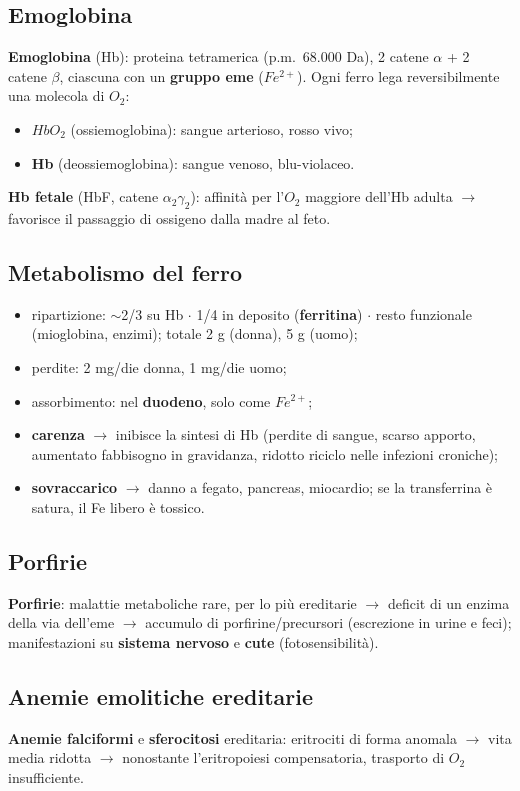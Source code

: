 \subsection{Emoglobina}
\textbf{Emoglobina} (Hb): proteina tetramerica (p.m.\ 68.000 Da), 2 catene $\alpha$ + 2 catene
$\beta$, ciascuna con un \textbf{gruppo eme} ($Fe^{2+}$). Ogni ferro lega reversibilmente una
molecola di $O_2$:
\begin{itemize}
  \item \textbf{$HbO_2$} (ossiemoglobina): sangue arterioso, rosso vivo;
  \item \textbf{Hb} (deossiemoglobina): sangue venoso, blu-violaceo.
\end{itemize}
\textbf{Hb fetale} (HbF, catene $\alpha_2\gamma_2$): affinità per l'$O_2$ maggiore dell'Hb adulta
$\rightarrow$ favorisce il passaggio di ossigeno dalla madre al feto.

\subsection{Metabolismo del ferro}
\begin{itemize}
  \item ripartizione: $\sim$2/3 su Hb $\cdot$ 1/4 in deposito (\textbf{ferritina}) $\cdot$ resto
    funzionale (mioglobina, enzimi); totale 2 g (donna), 5 g (uomo);
  \item perdite: 2 mg/die donna, 1 mg/die uomo;
  \item assorbimento: nel \textbf{duodeno}, solo come $Fe^{2+}$;
  \item \textbf{carenza} $\rightarrow$ inibisce la sintesi di Hb (perdite di sangue, scarso apporto,
    aumentato fabbisogno in gravidanza, ridotto riciclo nelle infezioni croniche);
  \item \textbf{sovraccarico} $\rightarrow$ danno a fegato, pancreas, miocardio; se la transferrina
    è satura, il Fe libero è tossico.
\end{itemize}

\subsection{Porfirie}
\textbf{Porfirie}: malattie metaboliche rare, per lo più ereditarie $\rightarrow$ deficit di un
enzima della via dell'eme $\rightarrow$ accumulo di porfirine/precursori (escrezione in urine e
feci); manifestazioni su \textbf{sistema nervoso} e \textbf{cute} (fotosensibilità).

\subsection{Anemie emolitiche ereditarie}
\textbf{Anemie falciformi} e \textbf{sferocitosi} ereditaria: eritrociti di forma anomala
$\rightarrow$ vita media ridotta $\rightarrow$ nonostante l'eritropoiesi compensatoria, trasporto
di $O_2$ insufficiente.

